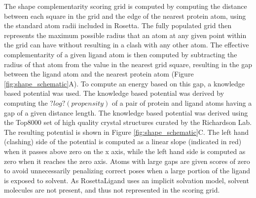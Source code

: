 The shape complementarity scoring grid is computed by computing the distance between each square in the grid and the edge of the nearest protein atom, using the standard atom radii included in Rosetta.
The fully populated grid then represents the maximum possible radius that an atom at any given point within the grid can have without resulting in a clash with any other atom.
The effective complementarity of a given ligand atom is then computed by subtracting the radius of that atom from the value in the nearest grid square, resulting in the gap between the ligand atom and the nearest protein atom (Figure \ref{fig:shape_schematic}A). 
To compute an energy based on this gap, a knowledge based potential was used. 
The knowledge based potential was derived by computing the $?log?(propensity)$ of a pair of protein and ligand atoms having a gap of a given distance length.
The knowledge based potential was derived using the Top8000 set of high quality crystal structures curated by the Richardson Lab.
The resulting potential is shown in Figure \ref{fig:shape_schematic}C.
The left hand (clashing) side of the potential is computed as a linear slope (indicated in red) when it passes above zero on the x axis, while the left hand side is computed as zero when it reaches the zero axis.
Atoms with large gaps are given scores of zero to avoid unnecessarily penalizing correct poses when a large portion of the ligand is exposed to solvent.
As RosettaLigand uses an implicit solvation model, solvent molecules are not present, and thus not represented in the scoring grid.

